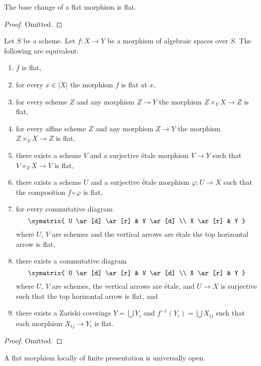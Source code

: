 \begin{lemma}
\label{lemma-base-change-flat}
The base change of a flat morphism is flat.
\end{lemma}

\begin{proof}
Omitted.
\end{proof}

\begin{lemma}
\label{lemma-flat-local}
Let $S$ be a scheme.
Let $f : X \to Y$ be a morphism of algebraic spaces over $S$.
The following are equivalent:
\begin{enumerate}
\item $f$ is flat,
\item for every $x \in |X|$ the morphism $f$ is flat at $x$,
\item for every scheme $Z$ and any morphism $Z \to Y$ the morphism
$Z \times_Y X \to Z$ is flat,
\item for every affine scheme $Z$ and any morphism
$Z \to Y$ the morphism $Z \times_Y X \to Z$ is flat,
\item there exists a scheme $V$ and a surjective \'etale morphism
$V \to Y$ such that $V \times_Y X \to V$ is flat,
\item there exists a scheme $U$ and a surjective \'etale morphism
$\varphi : U \to X$ such that the composition $f \circ \varphi$
is flat,
\item for every commutative diagram
$$
\xymatrix{
U \ar[d] \ar[r] & V \ar[d] \\
X \ar[r] & Y
}
$$
where $U$, $V$ are schemes and the vertical arrows are \'etale
the top horizontal arrow is flat,
\item there exists a commutative diagram
$$
\xymatrix{
U \ar[d] \ar[r] & V \ar[d] \\
X \ar[r] & Y
}
$$
where $U$, $V$ are schemes, the vertical arrows are \'etale, and
$U \to X$ is surjective such that the top horizontal arrow is flat, and
\item there exists a Zariski coverings $Y = \bigcup Y_i$ and
$f^{-1}(Y_i) = \bigcup X_{ij}$ such that
each morphism $X_{ij} \to Y_i$ is flat.
\end{enumerate}
\end{lemma}

\begin{proof}
Omitted.
\end{proof}

\begin{lemma}
\label{lemma-fppf-open}
A flat morphism locally of finite presentation is universally open.
\end{lemma}

